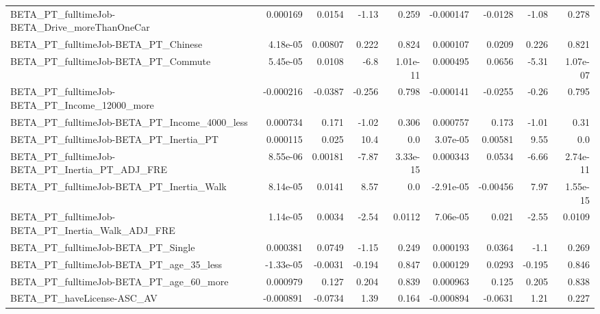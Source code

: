 \begin{tabular}{lrrrrrrrr}
BETA\_PT\_fulltimeJob-BETA\_Drive\_moreThanOneCar      &    0.000169 &       0.0154 &    -1.13 &    0.259 &  -0.000147 &     -0.0128 &        -1.08 &         0.278 \\
BETA\_PT\_fulltimeJob-BETA\_PT\_Chinese                &    4.18e-05 &      0.00807 &    0.222 &    0.824 &   0.000107 &      0.0209 &        0.226 &         0.821 \\
BETA\_PT\_fulltimeJob-BETA\_PT\_Commute                &    5.45e-05 &       0.0108 &     -6.8 & 1.01e-11 &   0.000495 &      0.0656 &        -5.31 &      1.07e-07 \\
BETA\_PT\_fulltimeJob-BETA\_PT\_Income\_12000\_more      &   -0.000216 &      -0.0387 &   -0.256 &    0.798 &  -0.000141 &     -0.0255 &        -0.26 &         0.795 \\
BETA\_PT\_fulltimeJob-BETA\_PT\_Income\_4000\_less       &    0.000734 &        0.171 &    -1.02 &    0.306 &   0.000757 &       0.173 &        -1.01 &          0.31 \\
BETA\_PT\_fulltimeJob-BETA\_PT\_Inertia\_PT             &    0.000115 &        0.025 &     10.4 &      0.0 &   3.07e-05 &     0.00581 &         9.55 &           0.0 \\
BETA\_PT\_fulltimeJob-BETA\_PT\_Inertia\_PT\_ADJ\_FRE     &    8.55e-06 &      0.00181 &    -7.87 & 3.33e-15 &   0.000343 &      0.0534 &        -6.66 &      2.74e-11 \\
BETA\_PT\_fulltimeJob-BETA\_PT\_Inertia\_Walk           &    8.14e-05 &       0.0141 &     8.57 &      0.0 &  -2.91e-05 &    -0.00456 &         7.97 &      1.55e-15 \\
BETA\_PT\_fulltimeJob-BETA\_PT\_Inertia\_Walk\_ADJ\_FRE   &    1.14e-05 &       0.0034 &    -2.54 &   0.0112 &   7.06e-05 &       0.021 &        -2.55 &        0.0109 \\
BETA\_PT\_fulltimeJob-BETA\_PT\_Single                 &    0.000381 &       0.0749 &    -1.15 &    0.249 &   0.000193 &      0.0364 &         -1.1 &         0.269 \\
BETA\_PT\_fulltimeJob-BETA\_PT\_age\_35\_less            &   -1.33e-05 &      -0.0031 &   -0.194 &    0.847 &   0.000129 &      0.0293 &       -0.195 &         0.846 \\
BETA\_PT\_fulltimeJob-BETA\_PT\_age\_60\_more            &    0.000979 &        0.127 &    0.204 &    0.839 &   0.000963 &       0.125 &        0.205 &         0.838 \\
BETA\_PT\_haveLicense-ASC\_AV                         &   -0.000891 &      -0.0734 &     1.39 &    0.164 &  -0.000894 &     -0.0631 &         1.21 &         0.227 \\

\end{tabular}
